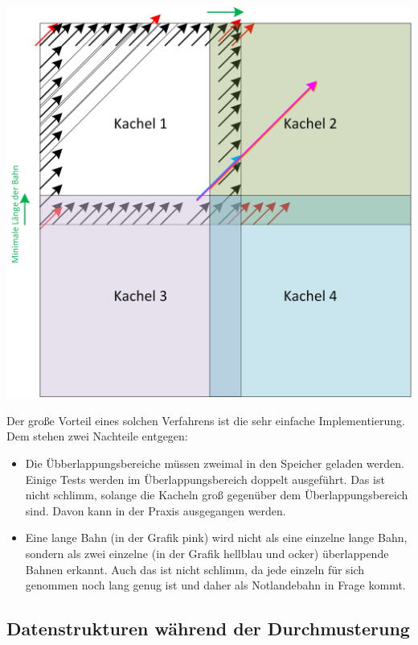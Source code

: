 \documentclass[
11pt, %
a4paper, %
oneside, %
pdfspacing, %
headinclude,
BCOR5mm, %
ngerman, %
bibtotocnumbered,
]{scrartcl}
\begin{document}
\includegraphics[width=\textwidth]{./drawings/UeberlappungKacheln.png}

Der große Vorteil eines solchen Verfahrens ist die sehr einfache Implementierung. Dem stehen zwei Nachteile entgegen:
\begin{itemize}
	\item Die Übberlappungsbereiche müssen zweimal in den Speicher geladen werden. Einige Tests werden im Überlappungsbereich doppelt ausgeführt. Das ist nicht schlimm, solange die Kacheln groß gegenüber dem Überlappungsbereich sind. Davon kann in der Praxis ausgegangen werden.
	\item Eine lange Bahn (in der Grafik pink) wird nicht als eine einzelne lange Bahn, sondern als zwei einzelne (in der Grafik hellblau und ocker) überlappende Bahnen erkannt. Auch das ist nicht schlimm, da jede einzeln für sich genommen noch lang genug ist und daher als Notlandebahn in Frage kommt.
\end{itemize}


\subsection{Datenstrukturen während der Durchmusterung}
\end{document}
